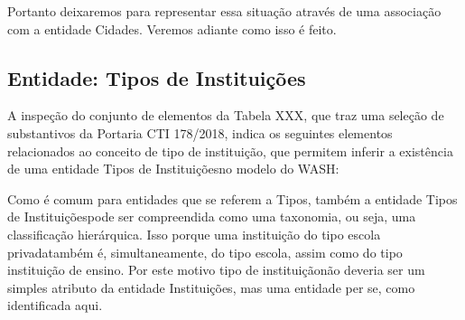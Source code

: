 \documentclass[
12pt,		%
openright,	%
twoside,  %
a4paper,			%
chapter=TITLE,		%
english,			%
french,				%
spanish,			%
brazil				%
]{USPSC-classe/USPSC}
\begin{document}
Portanto deixaremos para representar essa situa\c{c}\~ao atrav\'es de uma associa\c{c}\~ao com a entidade \textquotedbl Cidades\textquotedbl . Veremos adiante como isso \'e feito.














\subsection[Entidade: Tipos de Institui\c{c}\~oes]{Entidade: Tipos de Institui\c{c}\~oes}\label{Entidade: Tipos de Institui\c{c}\~oes}
A inspe\c{c}\~ao do conjunto de elementos da Tabela XXX, que traz uma sele\c{c}\~ao de substantivos da Portaria CTI 178/2018, indica os seguintes elementos relacionados ao conceito de \textquotedbl tipo de institui\c{c}\~ao\textquotedbl , que permitem inferir a exist\^encia de uma entidade \textquotedbl Tipos de Institui\c{c}\~oes\textquotedbl  no modelo do WASH:















\noindent\begin{center}\mbox{\centering{}}\end{center}


Como \'e comum para entidades que se referem a \textquotedbl Tipos\textquotedbl , tamb\'em a entidade \textquotedbl Tipos de Institui\c{c}\~oes\textquotedbl  pode ser compreendida como uma taxonomia, ou seja, uma classifica\c{c}\~ao hier\'arquica. Isso porque uma institui\c{c}\~ao do tipo \textquotedbl escola privada\textquotedbl  tamb\'em \'e, simultaneamente, do tipo \textquotedbl escola\textquotedbl , assim como do tipo \textquotedbl institui\c{c}\~ao de ensino\textquotedbl . Por este motivo \textquotedbl tipo de institui\c{c}\~ao\textquotedbl  n\~ao deveria ser um simples atributo da entidade \textquotedbl Institui\c{c}\~oes\textquotedbl , mas uma entidade per se, como identificada aqui.
\end{document}
